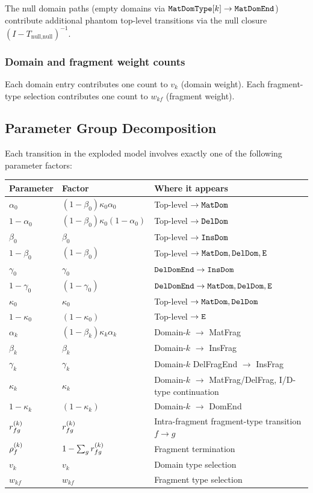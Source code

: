 The null domain paths (empty domains via $\mathtt{MatDomType}[k] \to \mathtt{MatDomEnd}$)
contribute additional phantom top-level transitions via the null closure
$(I - T_{\text{null},\text{null}})^{-1}$.

\subsubsection{Domain and fragment weight counts}

Each domain entry contributes one count to $v_k$ (domain weight).
Each fragment-type selection contributes one count to $w_{kf}$ (fragment weight).

\subsection{Parameter Group Decomposition}

Each transition in the exploded model involves exactly one of the
following parameter factors:

\begin{center}
\begin{tabular}{lll}
\hline
Parameter & Factor & Where it appears \\
\hline
$\alpha_0$ & $(1-\beta_0)\kappa_0\alpha_0$ & Top-level $\to \mathtt{MatDom}$ \\
$1-\alpha_0$ & $(1-\beta_0)\kappa_0(1-\alpha_0)$ & Top-level $\to \mathtt{DelDom}$ \\
$\beta_0$ & $\beta_0$ & Top-level $\to \mathtt{InsDom}$ \\
$1-\beta_0$ & $(1-\beta_0)$ & Top-level $\to \mathtt{MatDom}, \mathtt{DelDom}, {\tt E}$ \\
$\gamma_0$ & $\gamma_0$ & $\mathtt{DelDomEnd} \to \mathtt{InsDom}$ \\
$1-\gamma_0$ & $(1-\gamma_0)$ & $\mathtt{DelDomEnd} \to \mathtt{MatDom}, \mathtt{DelDom}, {\tt E}$ \\
$\kappa_0$ & $\kappa_0$ & Top-level $\to \mathtt{MatDom}, \mathtt{DelDom}$ \\
$1-\kappa_0$ & $(1-\kappa_0)$ & Top-level $\to {\tt E}$ \\
$\alpha_k$ & $(1-\beta_k)\kappa_k\alpha_k$ & Domain-$k$ $\to$ MatFrag \\
$\beta_k$ & $\beta_k$ & Domain-$k$ $\to$ InsFrag \\
$\gamma_k$ & $\gamma_k$ & Domain-$k$ DelFragEnd $\to$ InsFrag  \\
$\kappa_k$ & $\kappa_k$ & Domain-$k$ $\to$ MatFrag/DelFrag, I/D-type continuation \\
$1-\kappa_k$ & $(1-\kappa_k)$ & Domain-$k$ $\to$ DomEnd \\
$r^{(k)}_{fg}$ & $r^{(k)}_{fg}$ & Intra-fragment fragment-type transition $f \to g$ \\
$\rho^{(k)}_f$ & $1 - \sum_g r^{(k)}_{fg}$ & Fragment termination \\
$v_k$ & $v_k$ & Domain type selection \\
$w_{kf}$ & $w_{kf}$ & Fragment type selection \\
\hline
\end{tabular}
\end{center}

